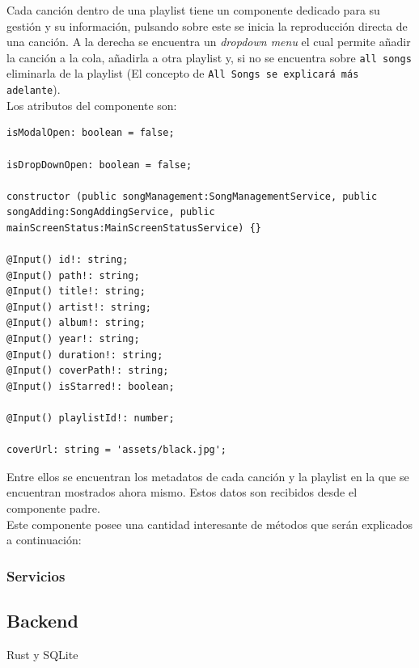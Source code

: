 \documentclass[11pt, a4paper]{article}
\begin{document}
                Cada canción dentro de una playlist tiene un componente dedicado para su gestión y su información, pulsando sobre este se inicia la reproducción directa de una canción. A la derecha se encuentra un \textit{dropdown menu} el cual permite añadir la canción a la cola, añadirla a otra playlist y, si no se encuentra sobre \verb|all songs| eliminarla de la playlist (El concepto de \verb|All Songs se explicará más adelante|). \\

                Los atributos del componente son:

                \begin{lstlisting}[caption={Atributos Song Button}]
isModalOpen: boolean = false;

isDropDownOpen: boolean = false;

constructor (public songManagement:SongManagementService, public songAdding:SongAddingService, public mainScreenStatus:MainScreenStatusService) {}

@Input() id!: string;
@Input() path!: string;
@Input() title!: string;
@Input() artist!: string;
@Input() album!: string;
@Input() year!: string;
@Input() duration!: string;
@Input() coverPath!: string;
@Input() isStarred!: boolean;

@Input() playlistId!: number;

coverUrl: string = 'assets/black.jpg';
                \end{lstlisting}

                Entre ellos se encuentran los metadatos de cada canción y la playlist en la que se encuentran mostrados ahora mismo. Estos datos son recibidos desde el componente padre. \\

                Este componente posee una cantidad interesante de métodos que serán explicados a continuación:

                

                

            \subsubsection{Servicios}

        \subsection{Backend}

        Rust y SQLite
\end{document}
